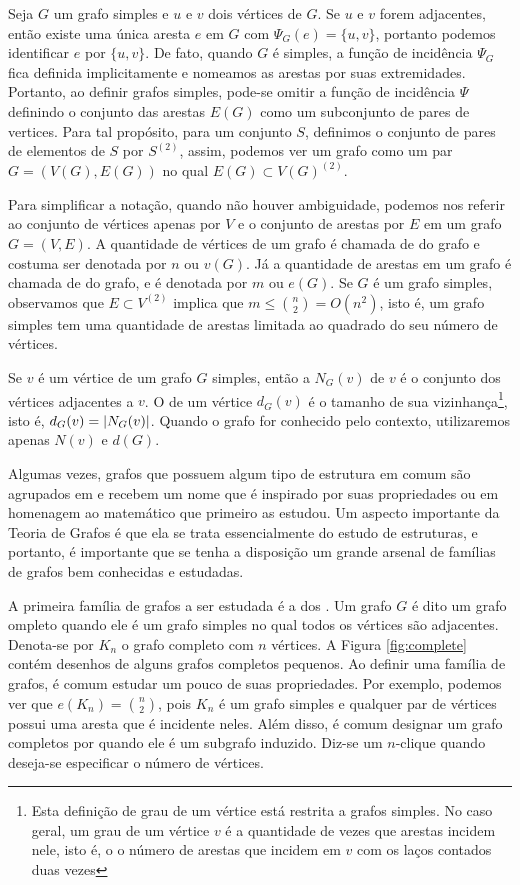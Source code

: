 Seja $G$ um grafo simples e $u$ e $v$ dois vértices de $G$. Se $u$ e $v$ forem adjacentes, então existe uma única aresta $e$ em $G$ com $\Psi_G(e) = \{u,v\}$, portanto podemos identificar $e$ por $\{u,v\}$. De fato, quando $G$ é simples, a função de incidência $\Psi_G$ fica definida implicitamente e nomeamos as arestas por suas extremidades. Portanto, ao definir grafos simples, pode-se omitir a função de incidência $\Psi$ definindo o conjunto das arestas $E(G)$ como um subconjunto de pares de vertices. Para tal propósito, para um conjunto $S$, definimos o conjunto de pares de elementos de $S$ por $S^{(2)}$, assim, podemos ver um grafo como um par $G = (V(G),E(G))$ no qual $E(G) \subset V(G)^{(2)}$.

Para simplificar a notação, quando não houver ambiguidade, podemos nos referir ao conjunto de vértices apenas por $V$ e o conjunto de arestas por $E$ em um grafo $G = (V,E)$. A quantidade de vértices de um grafo é chamada de  do grafo e costuma ser denotada por $n$ ou $v(G)$. Já a quantidade de arestas em um grafo é chamada de  do grafo, e é denotada por $m$ ou $e(G)$. Se $G$ é um grafo simples, observamos que $E \subset V^{(2)}$ implica que $m \leq \binom{n}{2} = O(n^2)$, isto é, um grafo simples tem uma quantidade de arestas limitada ao quadrado do seu número de vértices.

Se $v$ é um vértice de um grafo $G$ simples, então a  $N_G(v)$ de $v$ é o conjunto dos vértices adjacentes a $v$. O  de um vértice $d_G(v)$ é o tamanho de sua vizinhança\footnote{Esta definição de grau de um vértice está restrita a grafos simples. No caso geral, um grau de um vértice $v$ é a quantidade de vezes que arestas incidem nele, isto é, o o número de arestas que incidem em $v$ com os laços contados duas vezes}, isto é, $d_G(v) = \left | N_G(v) \right |$. Quando o grafo for conhecido pelo contexto, utilizaremos apenas $N(v)$ e $d(G)$.

Algumas vezes, grafos que possuem algum tipo de estrutura em comum são agrupados em  e recebem um nome que é inspirado por suas propriedades ou em homenagem ao matemático que primeiro as estudou. Um aspecto importante da Teoria de Grafos é que ela se trata essencialmente do estudo de estruturas, e portanto, é importante que se tenha a disposição um grande arsenal de famílias de grafos bem conhecidas e estudadas.

A primeira família de grafos a ser estudada é a dos . Um grafo $G$ é dito um grafo ompleto quando ele é um grafo simples no qual todos os vértices são adjacentes. Denota-se por $K_n$ o grafo completo com $n$ vértices. A Figura \ref{fig:complete} contém desenhos de alguns grafos completos pequenos. Ao definir uma família de grafos, é comum estudar um pouco de suas propriedades. Por exemplo, podemos ver que $e(K_n) = \binom{n}{2}$, pois $K_n$ é um grafo simples e qualquer par de vértices possui uma aresta que é incidente neles. Além disso, é comum designar um grafo completos por  quando ele é um subgrafo induzido. Diz-se um $n$-clique quando deseja-se especificar o número de vértices.


